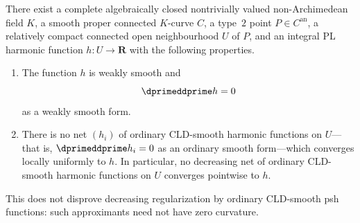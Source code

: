 \begin{proposition}
\label{prop:ch19-cld-smooth-harmonic-nonregularization}
There exist a complete algebraically closed nontrivially valued
non-Archimedean field $K$, a smooth proper connected $K$-curve $C$, a
type~$2$ point $P\in C^{\mathrm{an}}$, a relatively compact connected open
neighbourhood $U$ of $P$, and an integral PL harmonic function
$h:U\to\mathbf R$ with the following properties.
\begin{enumerate}
\item The function $h$ is weakly smooth and
\[
                         \dprimeddprime h=0
\]
as a weakly smooth form.
\item There is no net $(h_i)$ of ordinary CLD-smooth harmonic functions on
$U$---that is, $\dprimeddprime h_i=0$ as an ordinary smooth form---which
converges locally uniformly to $h$.  In particular, no decreasing net of
ordinary CLD-smooth harmonic functions on $U$ converges pointwise to $h$.
\end{enumerate}
This does not disprove decreasing regularization by ordinary CLD-smooth psh
functions: such approximants need not have zero curvature.
\end{proposition}
